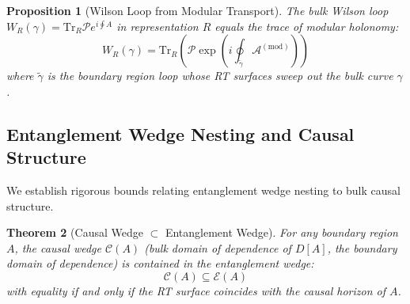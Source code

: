 \documentclass[12pt,a4paper]{article}
\newtheorem{theorem}{Theorem}[section]
\newtheorem{proposition}[theorem]{Proposition}
\begin{document}
\begin{proposition}[Wilson Loop from Modular Transport]
The bulk Wilson loop $W_R(\gamma) = \text{Tr}_R \mathcal{P} e^{i \oint A}$ in representation $R$ equals the trace of modular holonomy:
\begin{equation}
W_R(\gamma) = \text{Tr}_R\left( \mathcal{P} \exp\left( i \oint_{\tilde{\gamma}} \mathcal{A}^{(\text{mod})} \right) \right)
\end{equation}
where $\tilde{\gamma}$ is the boundary region loop whose RT surfaces sweep out the bulk curve $\gamma$.
\end{proposition}

\subsection{Entanglement Wedge Nesting and Causal Structure}

We establish rigorous bounds relating entanglement wedge nesting to bulk causal structure.

\begin{theorem}[Causal Wedge $\subset$ Entanglement Wedge]
For any boundary region $A$, the causal wedge $\mathcal{C}(A)$ (bulk domain of dependence of $D[A]$, the boundary domain of dependence) is contained in the entanglement wedge:
\begin{equation}
\mathcal{C}(A) \subseteq \mathcal{E}(A)
\end{equation}
with equality if and only if the RT surface coincides with the causal horizon of $A$.
\end{theorem}
\end{document}
